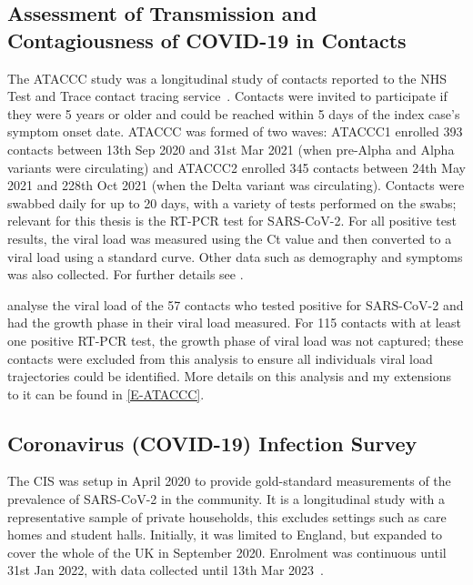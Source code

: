 \documentclass[thesis.tex]{subfiles}
\begin{document}
\subsection{Assessment of Transmission and Contagiousness of COVID-19 in Contacts}

The ATACCC study was a longitudinal study of contacts reported to the NHS Test and Trace contact tracing service~\autocite{hakkiOnset}.
Contacts were invited to participate if they were 5 years or older and  could be reached within 5 days of the index case's symptom onset date.
ATACCC was formed of two waves: ATACCC1 enrolled 393 contacts between 13th Sep 2020 and 31st Mar 2021 (when pre-Alpha and Alpha variants were circulating) and ATACCC2 enrolled 345 contacts between 24th May 2021 and 228th Oct 2021 (when the Delta variant was circulating).
Contacts were swabbed daily for up to 20 days, with a variety of tests performed on the swabs; relevant for this thesis is the RT-PCR test for SARS-CoV-2.
For all positive test results, the viral load was measured using the Ct value and then converted to a viral load using a standard curve.
Other data such as demography and symptoms was also collected.
For further details see \textcite{singanayagamDuration,hakkiOnset}.

\Textcite{hakkiOnset} analyse the viral load of the 57 contacts who tested positive for SARS-CoV-2 and had the growth phase in their viral load measured.
For 115 contacts with at least one positive RT-PCR test, the growth phase of viral load was not captured; these contacts were excluded from this analysis to ensure all individuals viral load trajectories could be identified.
More details on this analysis and my extensions to it can be found in \cref{E-ATACCC}.

\subsection{Coronavirus (COVID-19) Infection Survey} \label{intro:sec:cis}


The CIS was setup in April 2020 to provide gold-standard measurements of the prevalence of SARS-CoV-2 in the community.
It is a longitudinal study with a representative sample of private households, this excludes settings such as care homes and student halls.
Initially, it was limited to England, but expanded to cover the whole of the UK in September 2020.
Enrolment was continuous until 31st Jan 2022, with data collected until 13th Mar 2023~\autocite{weiRisk}. 
\end{document}
